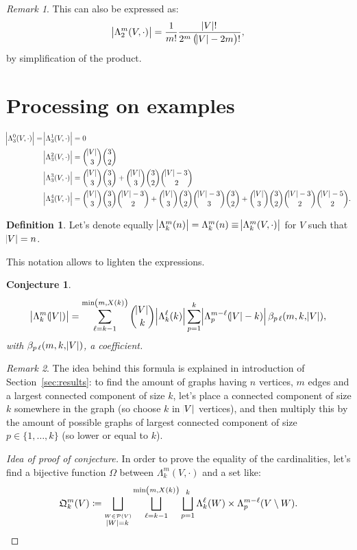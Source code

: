 \documentclass{article}
\newtheorem{conjecture}[lemma]{Conjecture}
\theoremstyle{definition}
\newtheorem{definition}[lemma]{Definition}
\theoremstyle{remark}
\newtheorem*{remark}{Remark}
\begin{document}
			\begin{remark} This can also be expressed as:
			\[\abs {\Lambda_2^m(V, \cdot)} = \frac 1{m!}\frac {\abs V!}{2^m\left(\abs V-2m\right)!},\]
			by simplification of the product.
			\end{remark}

\section{Processing on examples}
	\begin{align*}
		\abs {\Lambda_3^0(V, \cdot)} = \abs {\Lambda_3^1(V, \cdot)} &= 0 \\
		\abs {\Lambda_3^2(V, \cdot)} &= \binom {\abs V}3\binom 32 \\
		\abs {\Lambda_3^3(V, \cdot)} &= \binom {\abs V}3\binom 33 + \binom {\abs V}3\binom 32\binom {\abs V-3}2 \\
		\abs {\Lambda_3^4(V, \cdot)} &= \binom {\abs V}3\binom 33\binom {\abs V-3}2 + \binom {\abs V}3\binom 32\binom {\abs V-3}3\binom 32 + \binom {\abs V}3\binom 32\binom {\abs V-3}2\binom {\abs V-5}2.
	\end{align*}

	\begin{definition} Let's denote equally $\abs {\Lambda_k^m(n)} = \Lambda_k^m(n) \equiv \abs {\Lambda_k^m(V, \cdot)}$ for $V$ such that $\abs V = n$.
	\end{definition}

	This notation allows to lighten the expressions.

	\begin{conjecture}
	\[\abs {\Lambda_k^m(\abs V)}
		= \sum_{\ell=k-1}^{\min\left(m, X(k)\right)}\binom {\abs V}k\abs {\Lambda_k^\ell(k)}\sum_{p=1}^k\abs {\Lambda_p^{m-\ell}(\abs V-k)}\beta_{p\,\ell}(m, k, \abs V),\]
	with $\beta_{p\,\ell}(m, k, \abs V)$, a coefficient.
	\end{conjecture}

	\begin{remark} The idea behind this formula is explained in introduction of Section~\ref{sec:results}: to find the amount of graphs having $n$ vertices, $m$ edges
	and a largest connected component of size $k$, let's place a connected component of size $k$ somewhere in the graph (so choose $k$ in $\abs V$ vertices), and then multiply this
	by the amount of possible graphs of largest connected component of size $p \in \{1, \ldots, k\}$ (so lower or equal to $k$).
	\end{remark}

	\begin{proof}[Idea of proof of conjecture] In order to prove the equality of the cardinalities, let's find a bijective function $\Omega$ between
	$\Lambda_k^m(V, \cdot)$ and a set like:
	\[\mathfrak Q_k^m(V) \coloneqq \bigsqcup_{\stackrel {W \in \mathcal P(V)}{\abs W = k}}\bigsqcup_{\ell=k-1}^{\min\left(m, X(k)\right)}\bigsqcup_{p=1}^k
		\Lambda_k^\ell(W) \times \Lambda_p^{m-\ell}(V \setminus W).\]
	\end{proof}
\end{document}
